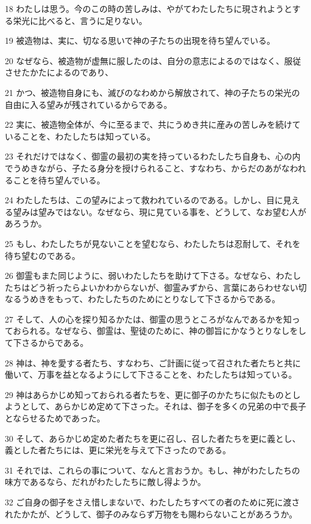 \par 18 わたしは思う。今のこの時の苦しみは、やがてわたしたちに現されようとする栄光に比べると、言うに足りない。
\par 19 被造物は、実に、切なる思いで神の子たちの出現を待ち望んでいる。
\par 20 なぜなら、被造物が虚無に服したのは、自分の意志によるのではなく、服従させたかたによるのであり、
\par 21 かつ、被造物自身にも、滅びのなわめから解放されて、神の子たちの栄光の自由に入る望みが残されているからである。
\par 22 実に、被造物全体が、今に至るまで、共にうめき共に産みの苦しみを続けていることを、わたしたちは知っている。
\par 23 それだけではなく、御霊の最初の実を持っているわたしたち自身も、心の内でうめきながら、子たる身分を授けられること、すなわち、からだのあがなわれることを待ち望んでいる。
\par 24 わたしたちは、この望みによって救われているのである。しかし、目に見える望みは望みではない。なぜなら、現に見ている事を、どうして、なお望む人があろうか。
\par 25 もし、わたしたちが見ないことを望むなら、わたしたちは忍耐して、それを待ち望むのである。
\par 26 御霊もまた同じように、弱いわたしたちを助けて下さる。なぜなら、わたしたちはどう祈ったらよいかわからないが、御霊みずから、言葉にあらわせない切なるうめきをもって、わたしたちのためにとりなして下さるからである。
\par 27 そして、人の心を探り知るかたは、御霊の思うところがなんであるかを知っておられる。なぜなら、御霊は、聖徒のために、神の御旨にかなうとりなしをして下さるからである。
\par 28 神は、神を愛する者たち、すなわち、ご計画に従って召された者たちと共に働いて、万事を益となるようにして下さることを、わたしたちは知っている。
\par 29 神はあらかじめ知っておられる者たちを、更に御子のかたちに似たものとしようとして、あらかじめ定めて下さった。それは、御子を多くの兄弟の中で長子とならせるためであった。
\par 30 そして、あらかじめ定めた者たちを更に召し、召した者たちを更に義とし、義とした者たちには、更に栄光を与えて下さったのである。
\par 31 それでは、これらの事について、なんと言おうか。もし、神がわたしたちの味方であるなら、だれがわたしたちに敵し得ようか。
\par 32 ご自身の御子をさえ惜しまないで、わたしたちすべての者のために死に渡されたかたが、どうして、御子のみならず万物をも賜わらないことがあろうか。
